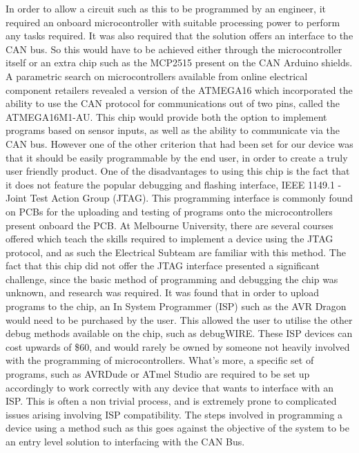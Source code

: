 In order to allow a circuit such as this to be programmed by an engineer, it required an onboard microcontroller with suitable processing power to perform any tasks required. It was also required that the solution offers an interface to the CAN bus. So this would have to be achieved either through the microcontroller itself or an extra chip such as the MCP2515 present on the CAN Arduino shields\cite{CAN_arduinoshield}. A parametric search on microcontrollers available from online electrical component retailers revealed a version of the ATMEGA16 which incorporated the ability to use the CAN protocol for communications out of two pins, called the ATMEGA16M1-AU\cite{ATMEGA16M1_datasheet}. This chip would provide both the option to implement programs based on sensor inputs, as well as the ability to communicate via the CAN bus. However one of the other criterion that had been set for our device was that it should be easily programmable by the end user, in order to create a truly user friendly product. One of the disadvantages to using this chip is the fact that it does not feature the popular debugging and flashing interface, IEEE 1149.1 - Joint Test Action Group (JTAG)\cite{ATMEGA16M1_datasheet}. This programming interface is commonly found on PCBs for the uploading and testing of programs onto the microcontrollers present onboard the PCB. At Melbourne University, there are several courses offered which teach the skills required to implement a device using the JTAG protocol, and as such the Electrical Subteam are familiar with this method. The fact that this chip did not offer the JTAG interface presented a significant challenge, since the basic method of programming and debugging the chip was unknown, and research was required. It was found that in order to upload programs to the chip, an In System Programmer (ISP) such as the AVR Dragon would need to be purchased by the user. This allowed the user to utilise the other debug methods available on the chip, such as debugWIRE\texttrademark\cite{ATMEGA16M1_datasheet}. These ISP devices can cost upwards of \$60\cite{AVRDRAGON_price}, and would rarely be owned by someone not heavily involved with the programming of microcontrollers. What's more, a specific set of programs, such as AVRDude or ATmel Studio are required to be set up accordingly to work correctly with any device that wants to interface with an ISP. This is often a non trivial process, and is extremely prone to complicated issues arising involving ISP compatibility. The steps involved in programming a device using a method such as this goes against the objective of the system to be an entry level solution to interfacing with the CAN Bus.


